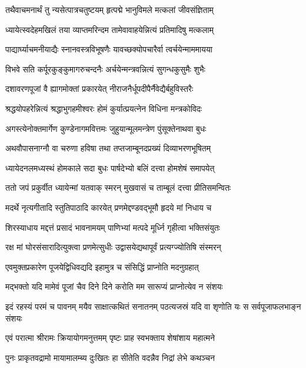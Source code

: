 \twolineshloka
{तथैवाचमनार्थं तु न्यसेत्पात्रचतुष्टयम्}
{हृत्पद्मे भानुविमले मत्कलां जीवसंज्ञिताम्} %

\twolineshloka
{ध्यायेत्स्वदेहमखिलं तया व्याप्तमरिन्दम}
{तामेवावाहयेन्नित्यं प्रतिमादिषु मत्कलाम्} %

\twolineshloka
{पाद्यार्घ्याचमनीयाद्यैः स्नानवस्त्रविभूषणैः}
{यावच्छक्योपचारैर्वा त्वर्चयेन्माममायया} %

\twolineshloka
{विभवे सति कर्पूरकुङ्कुमागरुचन्दनैः}
{अर्चयेन्मन्त्रवन्नित्यं सुगन्धकुसुमैः शुभैः} %

\twolineshloka
{दशावरणपूजां वै ह्यागमोक्तां प्रकारयेत्}
{नीराजनैर्धूपदीपैर्नैवेद्यैर्बहुविस्तरैः} %

\twolineshloka
{श्रद्धयोपहरेन्नित्यं श्रद्धाभुगहमीश्वरः}
{होमं कुर्यात्प्रयत्नेन विधिना मन्त्रकोविदः} %

\twolineshloka
{अगस्त्येनोक्तमार्गेण कुण्डेनागमवित्तमः}
{जुहुयान्मूलमन्त्रेण पुंसूक्तेनाथवा बुधः} %

\twolineshloka
{अथवौपासनाग्नौ वा चरुणा हविषा तथा}
{तप्तजाम्बूनदप्रख्यं दिव्याभरणभूषितम्} %

\twolineshloka
{ध्यायेदनलमध्यस्थं होमकाले सदा बुधः}
{पार्षदेभ्यो बलिं दत्त्वा होमशेषं समापयेत्} %

\twolineshloka
{ततो जपं प्रकुर्वीत ध्यायेन्मां यतवाक् स्मरन्}
{मुखवासं च ताम्बूलं दत्त्वा प्रीतिसमन्वितः} %

\twolineshloka
{मदर्थे नृत्यगीतादि स्तुतिपाठादि कारयेत्}
{प्रणमेद्दण्डवद्भूमौ हृदये मां निधाय च} %

\twolineshloka
{शिरस्याधाय मद्दत्तं प्रसादं भावनामयम्}
{पाणिभ्यां मत्पदे मूर्ध्नि गृहीत्वा भक्तिसंयुतः} %

\twolineshloka
{रक्ष मां घोरसंसारादित्युक्त्वा प्रणमेत्सुधीः}
{उद्वासयेद्यथापूर्वं प्रत्यग्ज्योतिषि संस्मरन्} %

\twolineshloka
{एवमुक्तप्रकारेण पूजयेद्विधिवद्यदि}
{इहामुत्र च संसिद्धिं प्राप्नोति मदनुग्रहात्} %

\twolineshloka
{मद्भक्तो यदि मामेवं पूजां चैव दिने दिने}
{करोति मम सारूप्यं प्राप्नोत्येव न संशयः} %

\fourlineindentedshloka
{इदं रहस्यं परमं च पावनम्}
{मयैव साक्षात्कथितं सनातनम्}
{पठत्यजस्रं यदि वा शृणोति यः}
{स सर्वपूजाफलभाङ्न संशयः} %

\twolineshloka
{एवं परात्मा श्रीरामः क्रियायोगमनुत्तमम्}
{पृष्टः प्राह स्वभक्ताय शेषांशाय महात्मने} %

\twolineshloka
{पुनः प्राकृतवद्रामो मायामालम्ब्य दुःखितः}
{हा सीतेति वदन्नैव निद्रां लेभे कथञ्चन} %

